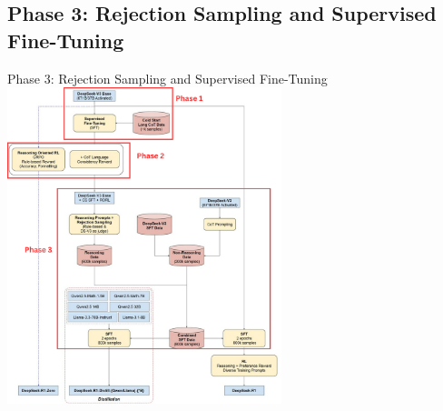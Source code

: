 \documentclass[8pt]{beamer}
\begin{document}
\subsection{Phase 3: Rejection Sampling and Supervised Fine-Tuning}

\begin{frame}{Phase 3: Rejection Sampling and Supervised Fine-Tuning}
\centering
\includegraphics[width=0.6\textwidth]{figures/phase3.png}
\end{frame}
\end{document}
